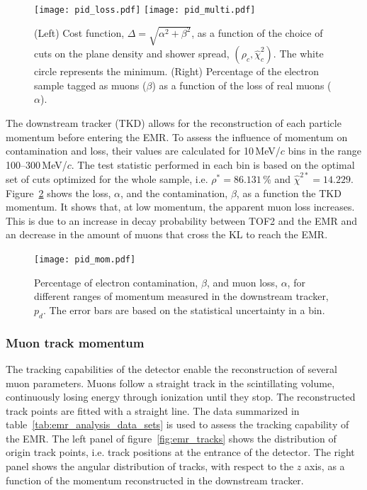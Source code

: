 \begin{figure}[htb!]
	\begin{center}
		\texttt{[image: pid\_loss.pdf]}
		\hfill
		\texttt{[image: pid\_multi.pdf]}
		\caption{(Left) Cost function, $\Delta=\sqrt{\alpha^2+\beta^2}$, as a function of the choice of cuts on the plane density and shower spread, $(\rho_c,\hat{\chi}^2_c)$. The white circle represents the minimum. (Right) Percentage of the electron sample tagged as muons ($\beta$) as a function of the loss of real muons ($\alpha$).}
		\label{fig:emr_pid_eff}
	\end{center}
\end{figure}

The downstream tracker (TKD) allows for the reconstruction of each particle momentum before entering the EMR. To assess the influence of momentum on contamination and loss, their values are calculated for 10\,MeV/$c$ bins in the range 100--300\,MeV/$c$. The test statistic performed in each bin is based on the optimal set of cuts optimized for the whole sample, i.e. $\rho^*=86.131$\,\% and $\hat{\chi}^{2*}=14.229$. Figure~\ref{fig:emr_pid_mom} shows the loss, $\alpha$, and the contamination, $\beta$, as a function the TKD momentum. It shows that, at low momentum, the apparent muon loss increases. This is due to an increase in decay probability between TOF2 and the EMR and an decrease in the amount of muons that cross the KL to reach the EMR.

\begin{figure}[htb!]
	\begin{center}
		\texttt{[image: pid\_mom.pdf]}  		
		\caption{Percentage of electron contamination, $\beta$, and muon loss, $\alpha$, for different ranges of momentum measured in the downstream tracker, $p_d$. The error bars are based on the statistical uncertainty in a bin.}
		\label{fig:emr_pid_mom}
	\end{center}
\end{figure}

\subsubsection{Muon track momentum}
The tracking capabilities of the detector enable the reconstruction of several muon parameters. Muons follow a straight track in the scintillating volume, continuously losing energy through ionization until they stop. The reconstructed track points are fitted with a straight line. The data summarized in table~\ref{tab:emr_analysis_data_sets} is used to assess the tracking capability of the EMR. The left panel of figure~\ref{fig:emr_tracks} shows the distribution of origin track points, i.e. track positions at the entrance of the detector. The right panel shows the angular distribution of tracks, with respect to the $z$ axis, as a function of the momentum reconstructed in the downstream tracker.

